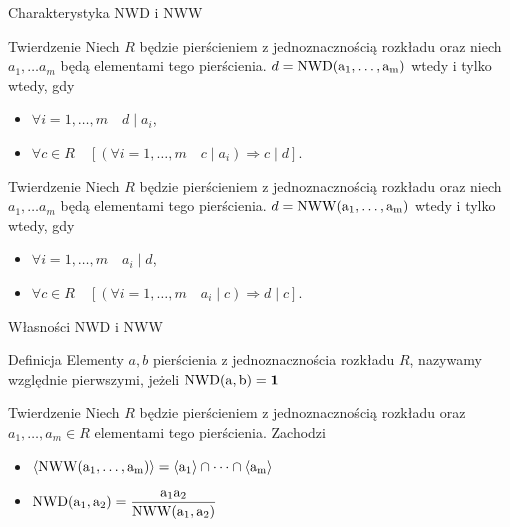 \documentclass{beamer}
\newcommand{\one}{\mathbf{1}}
\newcommand{\NWD}{\rm{NWD}}
\newcommand{\NWW}{\rm{NWW}}
\begin{document}
\begin{frame}{Charakterystyka NWD i NWW}
    \begin{block}{Twierdzenie}
        Niech $R$ będzie pierścieniem z jednoznacznością rozkładu oraz niech $a_1, \ldots a_m$ będą elementami tego pierścienia. $d = \NWD(a_1, \ldots, a_m)$ wtedy i tylko wtedy, gdy
        \begin{itemize}
            \item $\forall i=1,\ldots, m \quad d \mid a_i$, 
            \item $\forall c \in R  \quad [(\forall i=1 , \ldots , m \quad c \mid a_i)  \Rightarrow c \mid d]$.
        \end{itemize}
    \end{block}
    \pause 
    \begin{block}{Twierdzenie}
        Niech $R$ będzie pierścieniem z jednoznacznością rozkładu oraz niech $a_1, \ldots a_m$ będą elementami tego pierścienia. $d = \NWW(a_1, \ldots, a_m)$ wtedy i tylko wtedy, gdy
        \begin{itemize}
            \item $\forall i=1,\ldots, m \quad a_i \mid d$, 
            \item $\forall c \in R  \quad [(\forall i=1 , \ldots , m \quad a_i \mid c)  \Rightarrow d \mid c]$.
        \end{itemize}
    \end{block}
\end{frame}

\begin{frame}{Własności NWD i NWW}
    \begin{block}{Definicja}
        Elementy $a,b$ pierścienia z jednoznacznościa rozkładu $R$, nazywamy \alert{względnie pierwszymi}, jeżeli $\NWD(a,b) = \one$
    \end{block}
    \begin{block}{Twierdzenie}
        Niech $R$ będzie pierścieniem z jednoznacznością rozkładu oraz $a_1 , \ldots, a_m \in R$ elementami tego pierścienia. Zachodzi
        \begin{itemize}
            \item $\langle \NWW(a_1, \ldots , a_m) \rangle =  \langle a_1 \rangle \cap \cdots \cap \langle a_m \rangle$
            \item $\NWD(a_1, a_2) = \dfrac{a_1 a_2}{\NWW(a_1,a_2)}$
        \end{itemize}
    \end{block}
\end{frame}
\end{document}
